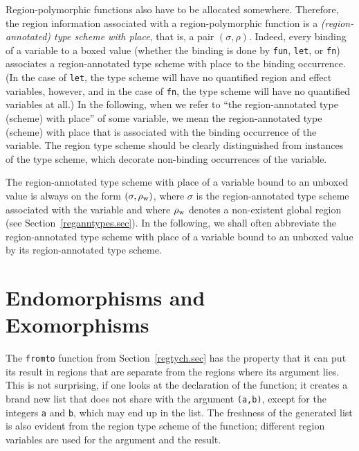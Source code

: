 \documentclass[12pt]{book}
\newcommand{\rhoword}{\rho_{\rm w}}
\begin{document}
%
%
Region-polymorphic functions also have to be allocated somewhere.
Therefore, the region information associated with a region-polymorphic
function is a {\em (region-annotated) type scheme with place}, that is, a pair
$(\sigma,\rho)$.  Indeed, every binding of a variable to a boxed value
(whether the binding is done by {\tt fun}, {\tt let}, or {\tt fn})
associates a region-annotated type scheme with place to the binding occurrence.
(In the case of {\tt let}, the type scheme will have no quantified
region and effect variables, however, and in the case of {\tt fn}, the
type scheme will have no quantified variables at all.)  In the
following, when we refer to ``the region-annotated type (scheme) with place'' of
some variable, we mean the region-annotated type (scheme) with place that is
associated with the binding occurrence of the variable. The region
type scheme should be clearly distinguished from instances of the type
scheme, which decorate non-binding occurrences of the variable.

The region-annotated type scheme with place of a variable bound to an unboxed
value is always on the form $(\sigma,\rhoword)$, where $\sigma$ is the
region-annotated type scheme associated with the variable and where $\rhoword$ denotes
a non-existent global region (see Section~\ref{reganntypes.sec}). In
the following, we shall often abbreviate the region-annotated type scheme with
place of a variable bound to an unboxed value by its region-annotated type
scheme.

\section{Endomorphisms and Exomorphisms}
The {\tt fromto} function from Section~\ref{regtych.sec} has the property that
it can put its result in regions that are separate from the regions where its
argument lies. This is not surprising, if one looks at the declaration of the
function; it creates a brand new list that does not share with the argument
{\tt (a,b)}, except for the integers {\tt a} and {\tt b}, which may end up in the list.
The freshness of the generated list is also evident from the region type scheme
of the function; different region variables are used for the argument and the result.
\end{document}
